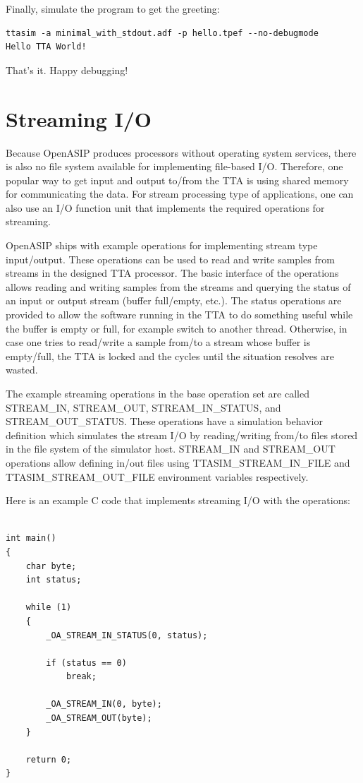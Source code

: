 \documentclass[a4paper,twoside]{tceusermanual}
\begin{document}
Finally, simulate the program to get the greeting:

\begin{verbatim}
ttasim -a minimal_with_stdout.adf -p hello.tpef --no-debugmode
Hello TTA World!
\end{verbatim}

That's it. Happy debugging!

\section{Streaming I/O}
\label{section:streamIO}

Because OpenASIP produces processors without operating system services, there is also
no file system available for implementing file-based I/O. Therefore, one
popular way to get input and output to/from the TTA is using shared memory
for communicating the data. For stream processing type of applications,
one can also use an I/O function unit that implements the required 
operations for streaming.

OpenASIP ships with example operations for implementing stream type input/output. 
These operations can be used to read and write samples from streams in the
designed TTA processor. The basic interface of the operations allows reading and 
writing samples from the streams and querying the status of an input or output stream 
(buffer full/empty, etc.). The status operations are provided to
allow the software running in the TTA to do something useful while the
buffer is empty or full, for example switch to another thread. Otherwise,
in case one tries to read/write a sample from/to a stream whose buffer is 
empty/full, the TTA is locked and the cycles until the situation resolves
are wasted.

The example streaming operations in the base operation set are 
called STREAM\_IN, STREAM\_OUT, STREAM\_IN\_STATUS, and STREAM\_OUT\_STATUS.
These operations have a simulation behavior definition which simulates the
stream I/O by reading/writing from/to files stored in the file system of 
the simulator host. STREAM\_IN and STREAM\_OUT operations allow defining
in/out files using TTASIM\_STREAM\_IN\_FILE and TTASIM\_STREAM\_OUT\_FILE
environment variables respectively.

Here is an example C code that implements streaming I/O with the operations:

\begin{verbatim}

int main()
{
    char byte;
    int status;

    while (1)
    {
        _OA_STREAM_IN_STATUS(0, status);

        if (status == 0)
            break;

        _OA_STREAM_IN(0, byte);
        _OA_STREAM_OUT(byte);
    }

    return 0;
}
\end{verbatim}
\end{document}
